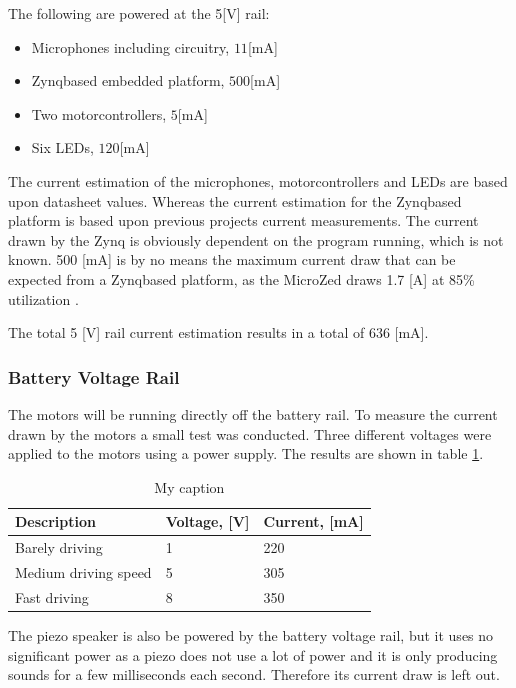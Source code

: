 The following are powered at the 5[V] rail:
\begin{itemize}
	\item Microphones including circuitry, $11$[mA]
	\item Zynqbased embedded platform, $500$[mA]
	\item Two motorcontrollers, $5$[mA]
	\item Six LEDs, $120$[mA]
\end{itemize}
The current estimation of the microphones, motorcontrollers and LEDs are based upon datasheet values. 
Whereas the current estimation for the Zynqbased platform is based upon previous projects current measurements. 
The current drawn by the Zynq is obviously dependent on the program running, which is not known.
500 [mA] is by no means the maximum current draw that can be expected from a Zynqbased platform, as the MicroZed draws 1.7 [A] at 85\% utilization \cite{microzed_hardware_guide}.

The total 5 [V] rail current estimation results in a total of $636$ [mA].

\subsubsection*{Battery Voltage Rail} %

The motors will be running directly off the battery rail.
To measure the current drawn by the motors a small test was conducted.
Three different voltages were applied to the motors using a power supply. 
The results are shown in table \ref{tab:motor_power}.

\begin{table}[h]
\centering
\caption{My caption}
\label{tab:motor_power}
\begin{tabular}{|l|l|l|}
\hline
\textbf{Description} & Voltage, [V]   & Current, [mA]      \\ \hline
Barely driving       & 1  & 220  \\ \hline
Medium driving speed & 5  & 305  \\ \hline
Fast driving         & 8  & 350  \\ \hline
\end{tabular}
\end{table}

The piezo speaker is also be powered by the battery voltage rail, but it uses no significant power as a piezo does not use a lot of power and it is only producing sounds for a few milliseconds each second. 
Therefore its current draw is left out.

